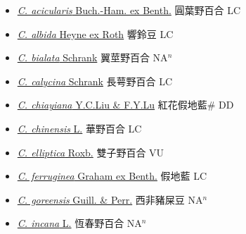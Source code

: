 \begin{itemize}
  \begin{itemize}
        \item[] \href{http://www.theplantlist.org/tpl1.1/search?q=Crotalaria+acicularis}{\textit{C. acicularis} Buch.-Ham. ex Benth.}   圓葉野百合 LC
        \item[] \href{http://www.theplantlist.org/tpl1.1/search?q=Crotalaria+albida}{\textit{C. albida} Heyne ex Roth}   響鈴豆 LC
        \item[] \href{http://www.theplantlist.org/tpl1.1/search?q=Crotalaria+bialata}{\textit{C. bialata} Schrank}   翼莖野百合 NA$^n$
        \item[] \href{http://www.theplantlist.org/tpl1.1/search?q=Crotalaria+calycina}{\textit{C. calycina} Schrank}   長萼野百合 LC
        \item[] \href{http://www.theplantlist.org/tpl1.1/search?q=Crotalaria+chiayiana}{\textit{C. chiayiana} Y.C.Liu \& F.Y.Lu}   紅花假地藍\# DD
        \item[] \href{http://www.theplantlist.org/tpl1.1/search?q=Crotalaria+chinensis}{\textit{C. chinensis} L.}   華野百合 LC
        \item[] \href{http://www.theplantlist.org/tpl1.1/search?q=Crotalaria+elliptica}{\textit{C. elliptica} Roxb.}   雙子野百合 VU
        \item[] \href{http://www.theplantlist.org/tpl1.1/search?q=Crotalaria+ferruginea}{\textit{C. ferruginea} Graham ex Benth.}   假地藍 LC
        \item[] \href{http://www.theplantlist.org/tpl1.1/search?q=Crotalaria+goreensis}{\textit{C. goreensis} Guill. \& Perr.}   西非豬屎豆 NA$^n$
        \item[] \href{http://www.theplantlist.org/tpl1.1/search?q=Crotalaria+incana}{\textit{C. incana} L.}   恆春野百合 NA$^n$

\end{itemize}
\end{itemize}
